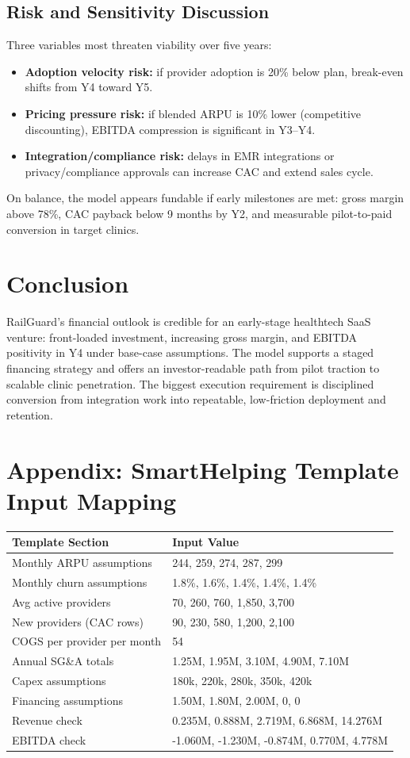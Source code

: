 \documentclass[11pt]{article}
\begin{document}
\subsection*{Risk and Sensitivity Discussion}
Three variables most threaten viability over five years:
\begin{itemize}
\item \textbf{Adoption velocity risk:} if provider adoption is 20\% below plan, break-even shifts from Y4 toward Y5.
\item \textbf{Pricing pressure risk:} if blended ARPU is 10\% lower (competitive discounting), EBITDA compression is significant in Y3--Y4.
\item \textbf{Integration/compliance risk:} delays in EMR integrations or privacy/compliance approvals can increase CAC and extend sales cycle.
\end{itemize}
On balance, the model appears fundable if early milestones are met: gross margin above 78\%, CAC payback below 9 months by Y2, and measurable pilot-to-paid conversion in target clinics.

\section*{Conclusion}
RailGuard's financial outlook is credible for an early-stage healthtech SaaS venture: front-loaded investment, increasing gross margin, and EBITDA positivity in Y4 under base-case assumptions. The model supports a staged financing strategy and offers an investor-readable path from pilot traction to scalable clinic penetration. The biggest execution requirement is disciplined conversion from integration work into repeatable, low-friction deployment and retention.

\section*{Appendix: SmartHelping Template Input Mapping}
\begin{center}
\begin{tabular}{p{} p{}}
\toprule
\textbf{Template Section} & \textbf{Input Value} \\
\midrule
Monthly ARPU assumptions & 244, 259, 274, 287, 299 \\
Monthly churn assumptions & 1.8\%, 1.6\%, 1.4\%, 1.4\%, 1.4\% \\
Avg active providers & 70, 260, 760, 1,850, 3,700 \\
New providers (CAC rows) & 90, 230, 580, 1,200, 2,100 \\
COGS per provider per month & 54 \\
Annual SG\&A totals & 1.25M, 1.95M, 3.10M, 4.90M, 7.10M \\
Capex assumptions & 180k, 220k, 280k, 350k, 420k \\
Financing assumptions & 1.50M, 1.80M, 2.00M, 0, 0 \\
Revenue check & 0.235M, 0.888M, 2.719M, 6.868M, 14.276M \\
EBITDA check & -1.060M, -1.230M, -0.874M, 0.770M, 4.778M \\
\bottomrule
\end{tabular}
\end{center}
\end{document}
